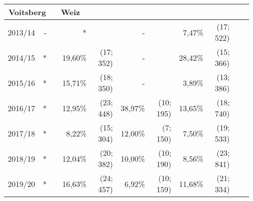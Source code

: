 \begin{table}[H]
\begin{tabular}{|c|*{5}{rr|}}
        \multicolumn{2}{c|}{Voitsberg} & 
        \multicolumn{2}{c|}{Weiz}  & 
        \multicolumn{2}{c|}{}
        \\
        \hline
        2013/14 & - &  &       * &           &       - &           &  7,47\% & (17; 522) &&\\
        2014/15 & * &  & 19,60\% & (17; 352) &       - &           & 28,42\% & (15; 366) &&\\
        2015/16 & * &  & 15,71\% & (18; 350) &       - &           &  3,89\% & (13; 386) &&\\
        2016/17 & * &  & 12,95\% & (23; 448) & 38,97\% & (10; 195) & 13,65\% & (18; 740) &&\\
        2017/18 & * &  &  8,22\% & (15; 304) & 12,00\% &  (7; 150) &  7,50\% & (19; 533) &&\\
        2018/19 & * &  & 12,04\% & (20; 382) & 10,00\% & (10; 190) &  8,56\% & (23; 841) &&\\
        2019/20 & * &  & 16,63\% & (24; 457) &  6,92\% & (10; 159) & 11,68\% & (21; 334) &&\\
        \hline
    \end{tabular}
\end{table}
